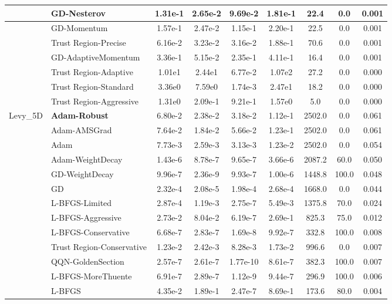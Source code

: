 \documentclass{article}
\begin{document}
\begin{longtable}{|l|l|c|c|c|c|c|c|c|}
\hline
 & GD-Nesterov & 1.31e-1 & 2.65e-2 & 9.69e-2 & 1.81e-1 & 22.4 & 0.0 & 0.001 \\
\hline
 & GD-Momentum & 1.57e-1 & 2.47e-2 & 1.15e-1 & 2.20e-1 & 22.5 & 0.0 & 0.001 \\
\hline
 & Trust Region-Precise & 6.16e-2 & 3.23e-2 & 3.16e-2 & 1.88e-1 & 70.6 & 0.0 & 0.001 \\
\hline
 & GD-AdaptiveMomentum & 3.36e-1 & 5.15e-2 & 2.35e-1 & 4.11e-1 & 16.4 & 0.0 & 0.001 \\
\hline
 & Trust Region-Adaptive & 1.01e1 & 2.44e1 & 6.77e-2 & 1.07e2 & 27.2 & 0.0 & 0.000 \\
\hline
 & Trust Region-Standard & 3.36e0 & 7.59e0 & 1.74e-3 & 2.47e1 & 18.2 & 0.0 & 0.000 \\
\hline
 & Trust Region-Aggressive & 1.31e0 & 2.09e-1 & 9.21e-1 & 1.57e0 & 5.0 & 0.0 & 0.000 \\
Levy\_5D & \textbf{Adam-Robust} & 6.80e-2 & 2.38e-2 & 3.18e-2 & 1.12e-1 & 2502.0 & 0.0 & 0.061 \\
\hline
 & Adam-AMSGrad & 7.64e-2 & 1.84e-2 & 5.66e-2 & 1.23e-1 & 2502.0 & 0.0 & 0.061 \\
\hline
 & Adam & 7.73e-3 & 2.59e-3 & 3.13e-3 & 1.23e-2 & 2502.0 & 0.0 & 0.054 \\
\hline
 & Adam-WeightDecay & 1.43e-6 & 8.78e-7 & 9.65e-7 & 3.66e-6 & 2087.2 & 60.0 & 0.050 \\
\hline
 & GD-WeightDecay & 9.96e-7 & 2.36e-9 & 9.93e-7 & 1.00e-6 & 1448.8 & 100.0 & 0.048 \\
\hline
 & GD & 2.32e-4 & 2.08e-5 & 1.98e-4 & 2.68e-4 & 1668.0 & 0.0 & 0.044 \\
\hline
 & L-BFGS-Limited & 2.87e-4 & 1.19e-3 & 2.75e-7 & 5.49e-3 & 1375.8 & 70.0 & 0.024 \\
\hline
 & L-BFGS-Aggressive & 2.73e-2 & 8.04e-2 & 6.19e-7 & 2.69e-1 & 825.3 & 75.0 & 0.012 \\
\hline
 & L-BFGS-Conservative & 6.68e-7 & 2.83e-7 & 1.69e-8 & 9.92e-7 & 332.8 & 100.0 & 0.008 \\
\hline
 & Trust Region-Conservative & 1.23e-2 & 2.42e-3 & 8.28e-3 & 1.73e-2 & 996.6 & 0.0 & 0.007 \\
\hline
 & QQN-GoldenSection & 2.57e-7 & 2.61e-7 & 1.77e-10 & 8.61e-7 & 382.3 & 100.0 & 0.007 \\
\hline
 & L-BFGS-MoreThuente & 6.91e-7 & 2.89e-7 & 1.12e-9 & 9.44e-7 & 296.9 & 100.0 & 0.006 \\
\hline
 & L-BFGS & 4.35e-2 & 1.89e-1 & 2.47e-7 & 8.69e-1 & 173.6 & 80.0 & 0.004 \\

\end{longtable}
\end{document}
